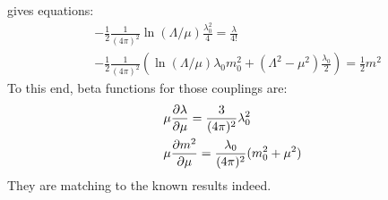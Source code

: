 gives equations:
\begin{align}
    &-\frac{1}{2} \frac{1}{(4\pi)^{2}} \ln (\Lambda / \mu) \frac{\lambda _{0} ^{2}}{4} = \frac{\lambda}{4!} \\
    &-\frac{1}{2} \frac{1}{(4\pi)^{2}} (\ln (\Lambda / \mu) \lambda _{0} m_{0}^{2} + (\Lambda ^{2} - \mu ^{2}) \frac{\lambda _{0}}{2}) = \frac{1}{2} m^{2} 
\end{align}
To this end, beta functions for those couplings are:
\begin{align}
    &\mu \pdv{\lambda}{\mu} = \frac{3}{(4\pi)^{2}} \lambda _{0} ^{2}\\
    &\mu \pdv{m^{2}}{\mu} = \frac{\lambda _{0}}{(4\pi)^{2}} (m_{0}^{2} + \mu ^{2})
\end{align}
They are matching to the known results indeed.